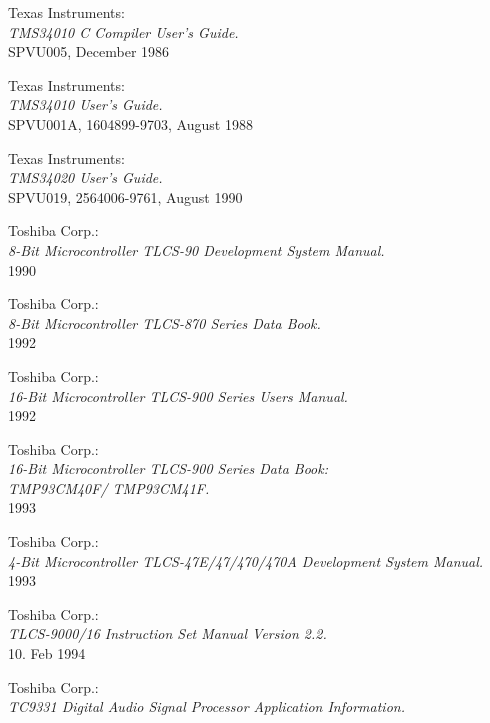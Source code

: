  Texas Instruments: \\
                     {\em TMS34010 C Compiler User's Guide.\/} \\
                     SPVU005, December 1986

 Texas Instruments: \\
                     {\em TMS34010 User's Guide.\/} \\
                     SPVU001A, 1604899-9703, August 1988

 Texas Instruments: \\
                     {\em TMS34020 User's Guide.\/} \\
                     SPVU019, 2564006-9761, August 1990

 Toshiba Corp.: \\
                 {\em 8-Bit Microcontroller TLCS-90 Development System
                 Manual.\/} \\
                 1990

 Toshiba Corp.: \\
                  {\em 8-Bit Microcontroller TLCS-870 Series Data
                  Book.\/} \\
                  1992

 Toshiba Corp.: \\
                  {\em 16-Bit Microcontroller TLCS-900 Series Users
                  Manual.\/} \\
                  1992

 Toshiba Corp.: \\
                   {\em 16-Bit Microcontroller TLCS-900 Series Data Book: \\
                    TMP93CM40F/ TMP93CM41F.\/} \\
                   1993

 Toshiba Corp.: \\
                 {\em 4-Bit Microcontroller TLCS-47E/47/470/470A Development
                  System Manual.\/} \\
                 1993

 Toshiba Corp.: \\
                   {\em TLCS-9000/16 Instruction Set Manual Version
                   2.2.\/} \\
                   10. Feb 1994

 Toshiba Corp.: \\
                   {\em TC9331 Digital Audio Signal Processor
                   Application Information.}

